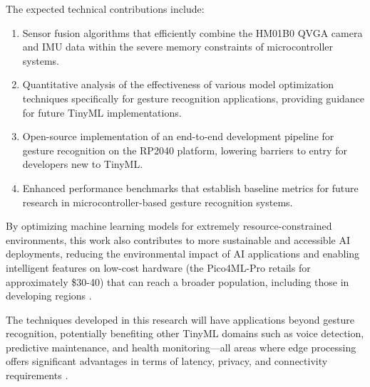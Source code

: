 The expected technical contributions include:

\begin{enumerate}
	\item Sensor fusion algorithms that efficiently combine the HM01B0 QVGA \cite{Arducam:2025b} camera and IMU data within the severe memory constraints of microcontroller systems.
	
	\item Quantitative analysis of the effectiveness of various model optimization techniques specifically for gesture recognition applications, providing guidance for future TinyML implementations.
	
	\item Open-source implementation of an end-to-end development pipeline for gesture recognition on the RP2040 platform, lowering barriers to entry for developers new to TinyML.
	
	\item Enhanced performance benchmarks that establish baseline metrics for future research in microcontroller-based gesture recognition systems.\\
\end{enumerate}




By optimizing machine learning models for extremely resource-constrained environments, this work also contributes to more sustainable and accessible AI deployments, reducing the environmental impact of AI applications and enabling intelligent features on low-cost hardware (the Pico4ML-Pro retails for approximately \$30-40) that can reach a broader population, including those in developing regions \cite{Arducam:2023,Sadiq:2022}.

The techniques developed in this research will have applications beyond gesture recognition, potentially benefiting other TinyML  domains such as voice detection, predictive maintenance, and health monitoring—all areas where edge processing offers significant advantages in terms of latency, privacy, and connectivity requirements \cite{Lin:2023,Loker:2023}.